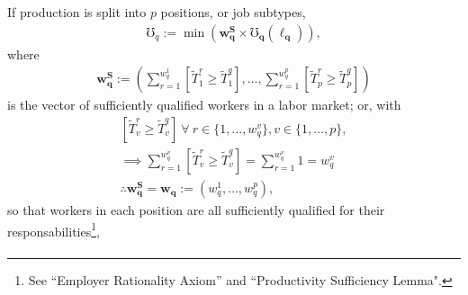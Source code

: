 \documentclass[hidelinks, nonatbib]{elsarticle}
\begin{document}
\begin{axiom}
    \begin{subaxiom}
        If production is split into $p$ positions, or job subtypes,
        \begin{gather}
            \mho_q
            :=
            \min\left(
                \boldsymbol{w_{q}^{S}}
                \times
                \boldsymbol{\mho_q}(
                    \boldsymbol{\ell_q}
                )
            \right)
            ,
        \end{gather}
        where
        \begin{gather}
            \boldsymbol{w_{q}^{S}}
            :=
            \left(
                \sum_{r=1}^{w_{q}^{1}}
                \left[
                    \tilde{T}_{1}^{r}
                    \geq
                    \tilde{T}_{1}^{q}
                \right]
                ,
                \dots
                ,
                \sum_{r=1}^{w_{q}^{p}}
                \left[
                    \tilde{T}_{p}^{r}
                    \geq
                    \tilde{T}_{p}^{q}
                \right]
            \right)
        \end{gather}
        is the vector of sufficiently qualified workers in a labor market; or, with
        \begin{gather}
            \left[
                \tilde{T}_{v}^{r}
                \geq
                \tilde{T}_{v}^{q}
            \right]
            \
            \forall
            \
            r \in \{1, \dots, w_{q}^{v}\}
            ,
            v \in \{1, \dots, p\}
            ,
            \\
            \implies
            \sum_{r=1}^{w_{q}^{v}}
            \left[
                \tilde{T}_{v}^{r}
                \geq
                \tilde{T}_{v}^{q}
            \right]
            =
            \sum_{r=1}^{w_{q}^{v}}
            1
            =
            w_{q}^{v}
            \\
            \therefore
            \boldsymbol{w_{q}^{S}}
            =
            \boldsymbol{w_q}
            :=
            (
                w_{q}^{1}
                ,
                \dots
                ,
                w_{q}^{p}
            )
            ,
        \end{gather}
        so that workers in each position are all sufficiently qualified for their responsabilities\footnote{
            See ``Employer Rationality Axiom'' and ``Productivity Sufficiency Lemma".
        },
        \begin{gather}

\end{gather}
\end{subaxiom}
\end{axiom}
\end{document}
